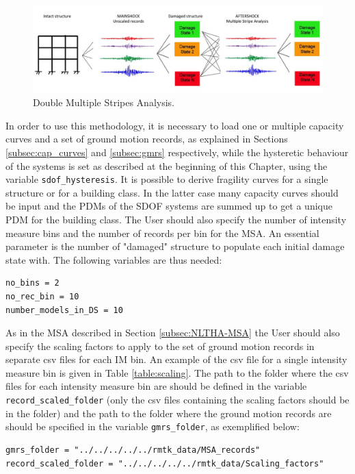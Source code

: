 {\begin{figure}[htb]
  \centering
      \includegraphics[width=14cm]{figures/2MSA.jpg}
  \caption{Double Multiple Stripes Analysis.}
  \label{fig:2msa}
\end{figure}

In order to use this methodology, it is necessary to load one or multiple capacity curves and a set of ground motion records, as explained in Sections \ref{subsec:cap_curves} and \ref{subsec:gmrs} respectively, while the hysteretic behaviour of the systems is set as described at the beginning of this Chapter, using the variable \verb=sdof_hysteresis=. 
It is possible to derive fragility curves for a single structure or for a building class. In the latter case many capacity curves should be input and the PDMs of the SDOF systems are summed up to get a unique PDM for the building class.
The User should also specify the number of intensity measure bins and the number of records per bin for the MSA. An essential parameter is the number of "damaged" structure to populate each initial damage state with. The following variables are thus needed:

\begin{Verbatim}[frame=single, commandchars=\\\{\}, samepage=true]
no_bins = 2
no_rec_bin = 10
number_models_in_DS = 10
\end{Verbatim}

As in the MSA described in Section \ref{subsec:NLTHA-MSA} the User should also specify the scaling factors to apply to the set of ground motion records in separate csv files for each IM bin. An example of the csv file for a single intensity measure bin is given in Table \ref{table:scaling}. The path to the folder where the csv files for each intensity measure bin are should be defined in the variable \verb=record_scaled_folder= (only the csv files containing the scaling factors should be in the folder) and the path to the folder where the ground motion records are should be specified in the variable \verb=gmrs_folder=, as exemplified below:

\begin{Verbatim}[frame=single, commandchars=\\\{\}, samepage=true]
gmrs_folder = "../../../../../rmtk_data/MSA_records"
record_scaled_folder = "../../../../../rmtk_data/Scaling_factors"
\end{Verbatim}

}
